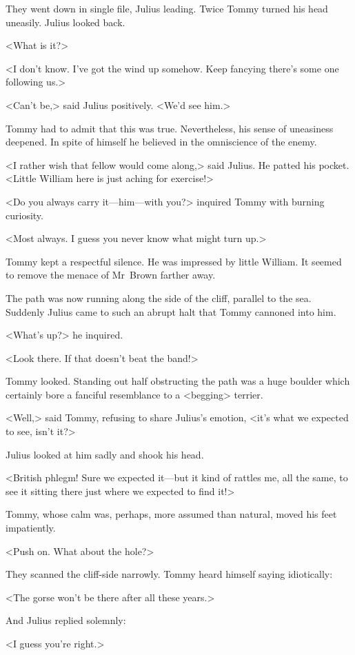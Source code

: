 They went down in single file, Julius leading. Twice Tommy turned his head uneasily. Julius looked back.

<What is it?>

<I don't know. I've got the wind up somehow. Keep fancying there's some one following us.>

<Can't be,> said Julius positively. <We'd see him.>

Tommy had to admit that this was true. Nevertheless, his sense of uneasiness deepened. In spite of himself he believed in the omniscience of the enemy.

<I rather wish that fellow would come along,> said Julius. He patted his pocket. <Little William here is just aching for exercise!>

<Do you always carry it—him—with you?> inquired Tommy with burning curiosity.

<Most always. I guess you never know what might turn up.>

Tommy kept a respectful silence. He was impressed by little William. It seemed to remove the menace of Mr~Brown farther away.

The path was now running along the side of the cliff, parallel to the sea. Suddenly Julius came to such an abrupt halt that Tommy cannoned into him.

<What's up?> he inquired.

<Look there. If that doesn't beat the band!>

Tommy looked. Standing out half obstructing the path was a huge boulder which certainly bore a fanciful resemblance to a <begging> terrier.

<Well,> said Tommy, refusing to share Julius's emotion, <it's what we expected to see, isn't it?>

Julius looked at him sadly and shook his head.

<British phlegm! Sure we expected it—but it kind of rattles me, all the same, to see it sitting there just where we expected to find it!>

Tommy, whose calm was, perhaps, more assumed than natural, moved his feet impatiently.

<Push on. What about the hole?>

They scanned the cliff-side narrowly. Tommy heard himself saying idiotically:

<The gorse won't be there after all these years.>

And Julius replied solemnly:

<I guess you're right.>

